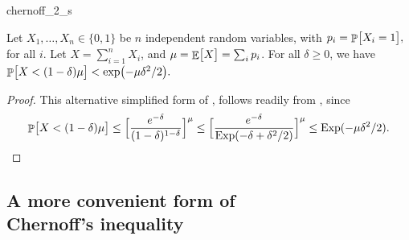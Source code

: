 \begin{fragment}{chernoff_2_s}
\begin{lemma}
    Let $X_1, \ldots, X_n \in \{0,1\}$ be $n$ independent random
    variables, with
    \begin{math}
        p_i = \Prob{ \bigl. X_i = 1 },
    \end{math}
    for all $i$.  Let $X = \sum_{i=1}^{n} X_i$, and
    $\mu = \mathop{\mathbb{E}}\!\left[ {\bigl. X} \right] = \sum_i p_i$. For all $\delta \geq 0$, we
    have
    \begin{math}
        \Prob{\bigl. X < (1-\delta)\mu } < \exp\bigl(-\mu\delta^2/2
        \bigr).
    \end{math}
\end{lemma}
\end{fragment}
\begin{proof}
    This alternative simplified form of , follows
    readily from , since
    \begin{equation*}
        \Prob{ X < (1-\delta)\mu \bigr.} %
        \leq%
        \Bigl[  \frac{e^{-\delta}}{(1-\delta)^{1-\delta}} \Bigr]^\mu%
        \leq
        \Bigl[  \frac{e^{-\delta}}{\Exp\pth{ -\delta + \delta^2/2} }
        \Bigr]^\mu%
        \leq
        \Exp( -\mu\delta^2/2).
    \end{equation*}
\end{proof}



\subsection[A more convenient form of Chernoff's inequality]{A more convenient form of\\ Chernoff's inequality}


